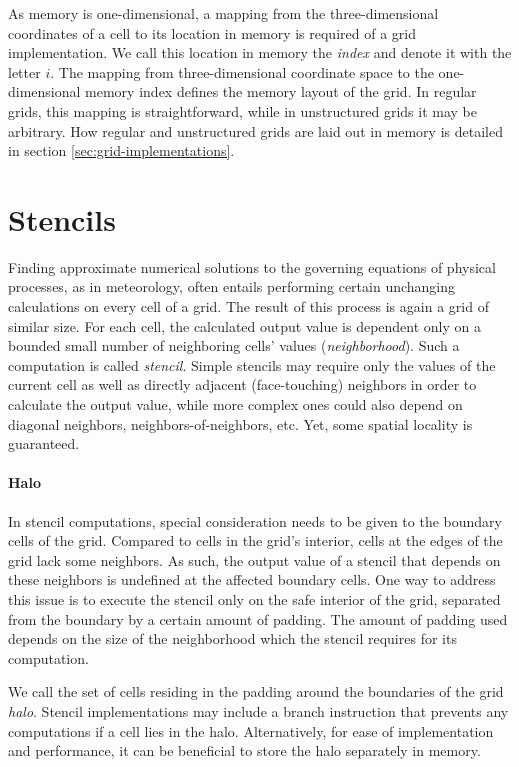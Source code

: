 As memory is one-dimensional, a mapping from the three-dimensional coordinates of a cell to its location in memory is required of a grid implementation. We call this location in memory the \emph{index} and denote it with the letter $i$. The mapping from three-dimensional coordinate space to the one-dimensional memory index defines the memory layout of the grid. In regular grids, this mapping is straightforward, while in unstructured grids it may be arbitrary. How regular and unstructured grids are laid out in memory is detailed in section \ref{sec:grid-implementations}.

\section{Stencils}                                    \label{sec:stencils}

Finding approximate numerical solutions to the governing equations of physical processes, as in meteorology, often entails performing certain unchanging calculations on every cell of a grid. The result of this process is again a grid of similar size. For each cell, the calculated output value is dependent only on a bounded small number of neighboring cells' values (\emph{neighborhood}). Such a computation is called \emph{stencil}. Simple stencils may require only the values of the current cell as well as directly adjacent (face-touching) neighbors in order to calculate the output value, while more complex ones could also depend on diagonal neighbors, neighbors-of-neighbors, etc. Yet, some spatial locality is guaranteed. 

\paragraph{Halo} \label{sec:halo} In stencil computations, special consideration needs to be given to the boundary cells of the grid. Compared to cells in the grid's interior, cells at the edges of the grid lack some neighbors. As such, the output value of a stencil that depends on these neighbors is undefined at the affected boundary cells. One way to address this issue is to execute the stencil only on the safe interior of the grid, separated from the boundary by a certain amount of padding. The amount of padding used depends on the size of the neighborhood which the stencil requires for its computation.

We call the set of cells residing in the padding around the boundaries of the grid \emph{halo}. Stencil implementations may include a branch instruction that prevents any computations if a cell lies in the halo. Alternatively, for ease of implementation and performance, it can be beneficial to store the halo separately in memory.

